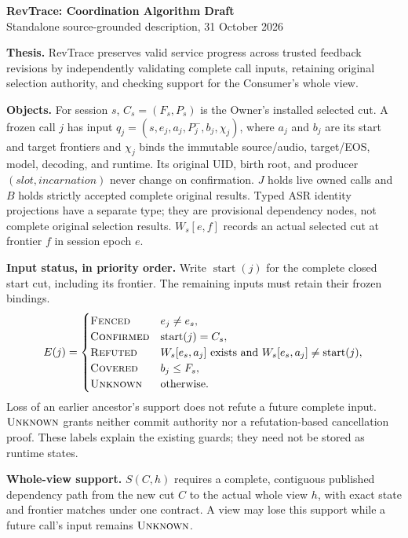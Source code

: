 \documentclass[10pt]{article}
\newcommand{\conf}{\textsc{Confirmed}}
\newcommand{\unk}{\textsc{Unknown}}
\newcommand{\refut}{\textsc{Refuted}}
\newcommand{\cov}{\textsc{Covered}}
\newcommand{\fenced}{\textsc{Fenced}}
\begin{document}
\begin{center}
{\large\bf RevTrace: Coordination Algorithm Draft}\\
{\small Standalone source-grounded description, 31 October 2026}
\end{center}

\textbf{Thesis.} RevTrace preserves valid service progress across trusted
feedback revisions by independently validating complete call inputs,
retaining original selection authority, and checking support for the
Consumer's whole view.

\textbf{Objects.} For session $s$, $C_s=(F_s,P_s)$ is the Owner's installed
selected cut. A frozen call $j$ has input
$q_j=(s,e_j,a_j,P_j^-,b_j,\chi_j)$, where $a_j$ and $b_j$ are its start and
target frontiers and $\chi_j$ binds the immutable source/audio, target/EOS,
model, decoding, and runtime. Its original UID, birth root, and producer
$(\mathit{slot},\mathit{incarnation})$ never change on confirmation.
$J$ holds live owned calls and $B$ holds strictly accepted complete original
results. Typed ASR identity projections have a separate type; they are
provisional dependency nodes, not complete original selection results.
$W_s[e,f]$ records an actual selected cut at frontier $f$ in session epoch $e$.

\textbf{Input status, in priority order.} Write $\operatorname{start}(j)$ for
the complete closed start cut, including its frontier. The remaining inputs
must retain their frozen bindings.
\[
 E(j)=\begin{cases}
 \fenced & e_j\ne e_s,\\
 \conf & \operatorname{start}(j)=C_s,\\
 \refut & W_s[e_s,a_j]\text{ exists and }W_s[e_s,a_j]\ne\operatorname{start}(j),\\
 \cov & b_j\le F_s,\\
 \unk & \text{otherwise.}
 \end{cases}
\]
Loss of an earlier ancestor's support does not refute a future complete
input. $\unk$ grants neither commit authority nor a refutation-based
cancellation proof. These labels explain the existing guards; they need
not be stored as runtime states.

\textbf{Whole-view support.} $S(C,h)$ requires a complete, contiguous
published dependency path from the new cut $C$ to the actual whole view $h$,
with exact state and frontier matches under one contract. A view may lose
this support while a future call's input remains $\unk$.
\end{document}
